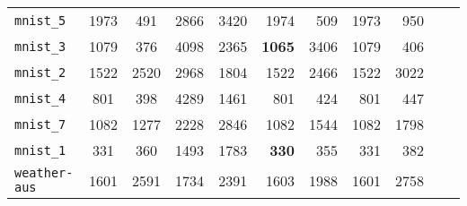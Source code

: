 \begin{tabular}{lccrrrrrrrr}
\texttt{mnist\_5} & 1973 & 491 & 2866 & 3420 & 1974 & 509 & 1973 & 950\\
\texttt{mnist\_3} & 1079 & 376 & 4098 & 2365 & \textbf{1065} & 3406 & 1079 & 406\\
\texttt{mnist\_2} & 1522 & 2520 & 2968 & 1804 & 1522 & 2466 & 1522 & 3022\\
\texttt{mnist\_4} & 801 & 398 & 4289 & 1461 & 801 & 424 & 801 & 447\\
\texttt{mnist\_7} & 1082 & 1277 & 2228 & 2846 & 1082 & 1544 & 1082 & 1798\\
\texttt{mnist\_1} & 331 & 360 & 1493 & 1783 & \textbf{330} & 355 & 331 & 382\\
\texttt{weather-aus} & 1601 & 2591 & 1734 & 2391 & 1603 & 1988 & 1601 & 2758\\
\bottomrule
\end{tabular}
